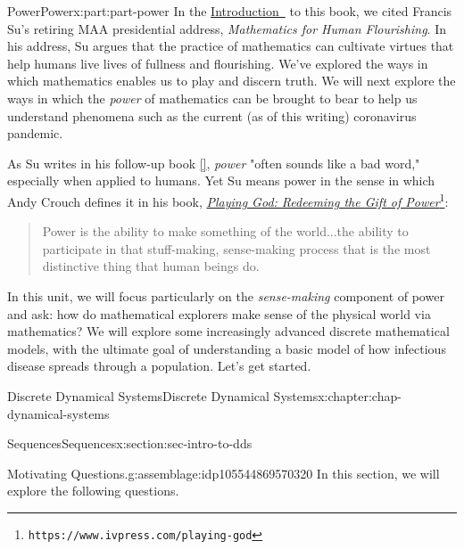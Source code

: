 \documentclass[oneside,10pt,]{book}
\newcommand{\xreffont}{\relax}
\numberwithin{equation}{section}
\begin{document}
\begin{partptx}{Power}{}{Power}{}{}{x:part:part-power}
 In the \hyperref[x:preface:Sec-Introduction]{Introduction~} to this book, we cited Francis Su's retiring MAA presidential address, \emph{Mathematics for Human Flourishing}. In his address, Su argues that the practice of mathematics can cultivate virtues that help humans live lives of fullness and flourishing. We've explored the ways in which mathematics enables us to play and discern truth. We will next explore the ways in which the \emph{power} of mathematics can be brought to bear to help us understand phenomena such as the current (as of this writing) coronavirus pandemic.%
\par
As Su writes in his follow-up book \hyperlink{x:biblio:Su2020}{[{\xreffont 1}]}, \emph{power} "often sounds like a bad word," especially when applied to humans. Yet Su means power in the sense in which Andy Crouch defines it in his book, \href{https://www.ivpress.com/playing-god}{\emph{Playing God: Redeeming the Gift of Power}}\footnote{\nolinkurl{https://www.ivpress.com/playing-god}\label{g:fn:idp105544869929104}}:%
\begin{quote}%
Power is the ability to make something of the world...the ability to participate in that stuff-making, sense-making process that is the most distinctive thing that human beings do.\end{quote}
In this unit, we will focus particularly on the \emph{sense-making} component of power and ask: how do mathematical explorers make sense of the physical world via mathematics? We will explore some increasingly advanced discrete mathematical models, with the ultimate goal of understanding a basic model of how infectious disease spreads through a population. Let's get started.%
%
\typeout{************************************************}
\typeout{************************************************}
%
\begin{chapterptx}{Discrete Dynamical Systems}{}{Discrete Dynamical Systems}{}{}{x:chapter:chap-dynamical-systems}
%
%
\typeout{************************************************}
\typeout{************************************************}
%
\begin{sectionptx}{Sequences}{}{Sequences}{}{}{x:section:sec-intro-to-dds}
\begin{assemblage}{Motivating Questions.}{g:assemblage:idp105544869570320}%
In this section, we will explore the following questions. %
\begin{enumerate}

\end{enumerate}
\end{assemblage}
\end{sectionptx}
\end{chapterptx}
\end{partptx}
\end{document}
